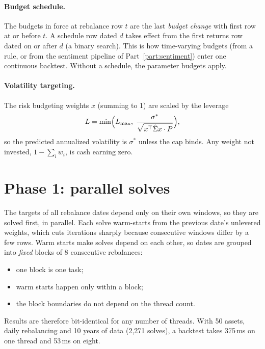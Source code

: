 \paragraph{Budget schedule.} The budgets in force at rebalance row $t$ are the last
\emph{budget change} with first row at or before $t$. A schedule row dated $d$ takes effect
from the first returns row dated on or after $d$ (a binary search). This is how
time-varying budgets (from a rule, or from the sentiment pipeline of Part~\ref{part:sentiment}) enter one continuous backtest. Without a
schedule, the parameter budgets apply.

\paragraph{Volatility targeting.} The risk budgeting weights $x$ (summing to 1) are scaled
by the leverage
\[
  L=\min\!\Big(L_{\max},\;\frac{\sigma^\ast}{\sqrt{x^\top\hat\Sigma x\cdot P}}\Big),
\]
so the predicted annualized volatility is $\sigma^\ast$ unless the cap binds. Any weight
not invested, $1-\sum_iw_i$, is cash earning zero.
\begin{codepointers}
\end{codepointers}

\section{Phase 1: parallel solves}
The targets of all rebalance dates depend only on their own windows, so they are solved
first, in parallel. Each solve warm-starts from the previous date's unlevered weights,
which cuts iterations sharply because consecutive windows differ by a few rows. Warm
starts make solves depend on each other, so dates are grouped into \emph{fixed} blocks of 8
consecutive rebalances:
\begin{itemize}
  \item one block is one task;
  \item warm starts happen only within a block;
  \item the block boundaries do not depend on the thread count.
\end{itemize}
Results are therefore bit-identical for any number of threads. With 50 assets, daily
rebalancing and 10 years of data (2,271 solves), a backtest takes 375\,ms on one thread and
53\,ms on eight.
\begin{codepointers}
\end{codepointers}

